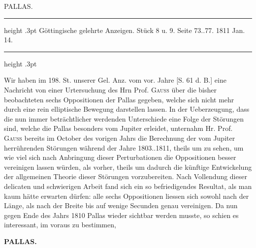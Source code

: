 \par\bigskip
{}
\hypertarget{native-327-lower}{}\label{native-327-lower}

\begin{center}\large PALLAS.\end{center}
\begin{center}
\parbox{.77\linewidth}{%
\centering\fontsize{8.2}{10.2}\selectfont
\hrule height .3pt\relax\vspace{2.5pt}
Göttingische gelehrte Anzeigen. Stück 8 u. 9. Seite 73..77. 1811 Jan. 14.\par
\vspace{2.5pt}\hrule height .3pt\relax
}
\end{center}

\par\indent Wir haben im 198. St. unserer Gel. Anz. vom vor. Jahre [S. 61 d. B.] eine Nachricht von einer Urtersuchung des Hrn Prof. \textsc{Gauss} über die bisher beobachteten sechs Oppositionen der Pallas gegeben, welche sich nicht mehr durch eine rein elliptische Bewegung darstellen lassen. In der Ueberzeugung, dass die nun immer beträchtlicher werdenden Unterschiede eine Folge der Störungen sind, welche die Pallas besonders vom Jupiter erleidet, unternahm Hr. Prof. \textsc{Gauss} bereits im October des vorigen Jahrs die Berechnung der vom Jupiter herrührenden Störungen während der Jahre 1803..1811, theils um zu sehen, um wie viel sich nach Anbringung dieser Perturbationen die Oppositionen besser vereinigen lassen würden, als vorher, theils um dadurch die künftige Entwickelung der allgemeinen Theorie dieser Störungen vorzubereiten. Nach Vollendung dieser delicaten und schwierigen Arbeit fand sich ein so befriedigendes Resultat, als man kaum hätte erwarten dürfen: alle sechs Oppositionen liessen sich sowohl nach der Länge, als nach der Breite bis auf wenige Secunden genau vereinigen. Da nun gegen Ende des Jahrs 1810 Pallas wieder sichtbar werden musste, so schien es interessant, im voraus zu bestimmen, \par
\clearpage
\thispagestyle{empty}
\noindent{}%
\makebox[12mm][l]{}%
\parbox[t]{\dimexpr\linewidth-24mm\relax}{\centering\footnotesize\bfseries PALLAS.\par}%
\par\nobreak\medskip
